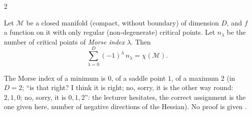 \begin{paracol}{2}
\begin{theorem}[Morse]\label{thm:c17-morse}
Let $\mathcal M$ be a closed manifold (compact, without boundary) of dimension $D$, and $f$ a function on it with only regular (non-degenerate) critical points. Let $n_\lambda$ be the number of critical points of \emph{Morse index} $\lambda$. Then
\[
  \sum_{\lambda=0}^{D}(-1)^\lambda\,n_\lambda=\chi(\mathcal M).
\]
\end{theorem}
The Morse index of a minimum is $0$, of a saddle point $1$, of a maximum $2$ (in $D=2$; ``is that right? I think it is right; no, sorry, it is the other way round: $2,1,0$; no, sorry, it is $0,1,2$'': the lecturer hesitates, the correct assignment is the one given here, number of negative directions of the Hessian). No proof is given .


\end{paracol}
